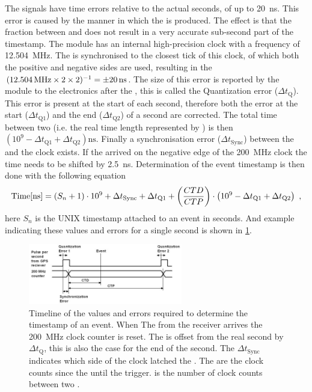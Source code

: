 The \pps signals have time errors relative to the actual \gps seconds, of up to \SI{20}{\ns}. This error is caused by the manner in which the \pps is produced. The effect is that the fraction between \ctd and \ctp does not result in a very accurate sub-second part of the timestamp. The \gps module has an internal high-precision clock with a frequency of \SI{12.504}{\mega\hertz}. The \pps is synchronised to the closest tick of this clock, of which both the positive and negative sides are used, resulting in the $(\SI{12.504}{\mega\hertz} \times 2 \times 2)^{-1} = \SI{\pm 20}{\ns}$. The size of this error is reported by the \gps module to the electronics after the \pps, this is called the Quantization error ($\Delta t_{\mathrm{Q}}$). This error is present at the start of each second, therefore both the error at the start ($\Delta t_{\mathrm{Q1}}$) and the end ($\Delta t_{\mathrm{Q2}}$) of a second are corrected. The total time between two \pps (i.e. the real time length represented by \ctp) is then $(10^9 - \Delta t_{\mathrm{Q1}} + \Delta t_{\mathrm{Q2}}) \si{\ns}$. Finally a synchronisation error ($\Delta t_{\mathrm{Sync}}$) between the \pps and the \hisparc clock exists. If the \pps arrived on the negative edge of the \SI{200}{\mega\hertz} clock the time needs to be shifted by \SI{2.5}{\ns}. Determination of the event timestamp is then done with the following equation
%
\begin{equation}
\label{eq:timestamp}
   \mathrm{Time[\si{\ns}]} =
      (S_n + 1) \cdot 10^9 +
      \Delta t_{\mathrm{Sync}} + \Delta t_{\mathrm{Q1}} +
      \left(\frac{\ctd}{\ctp}\right) \cdot
      \left(10^9 - \Delta t_{\mathrm{Q1}} + \Delta t_{\mathrm{Q2}}\right) \ ,
\end{equation}
%
here $S_n$ is the UNIX timestamp attached to an event in seconds. And example indicating these values and errors for a single \gps second is shown in \cref{fig:event_time}.

\begin{figure}
    \centering
    \includegraphics[width=0.6\textwidth]
                    {plots/cluster/event_time}
    \caption{Timeline of the values and errors required to determine the timestamp of an event. When The \pps from the \gps receiver arrives the \SI{200}{\mega\hertz} clock counter is reset. The \pps is offset from the real \gps second by $\Delta t_{\mathrm{Q}}$, this is also the case for the end of the second. The $\Delta t_{\mathrm{Sync}}$ indicates which side of the clock latched the \pps. The \ctd are the clock counts since the \pps until the trigger. \ctp is the number of clock counts between two \pps.}
    \label{fig:event_time}
\end{figure}

